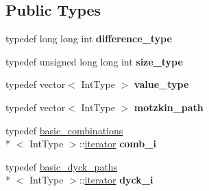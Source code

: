 \subsection*{Public Types}
\begin{DoxyCompactItemize}
\item 
\hypertarget{classdscr_1_1basic__motzkin__paths_a9402d615400ae3a6f0118ffd697b4b1e}{typedef long long int {\bfseries difference\-\_\-type}}\label{classdscr_1_1basic__motzkin__paths_a9402d615400ae3a6f0118ffd697b4b1e}

\item 
\hypertarget{classdscr_1_1basic__motzkin__paths_aed08930df85303a0579b29f517915c74}{typedef unsigned long long int {\bfseries size\-\_\-type}}\label{classdscr_1_1basic__motzkin__paths_aed08930df85303a0579b29f517915c74}

\item 
\hypertarget{classdscr_1_1basic__motzkin__paths_a840f3a00a0d533dfd0043452bf9e8f77}{typedef vector$<$ Int\-Type $>$ {\bfseries value\-\_\-type}}\label{classdscr_1_1basic__motzkin__paths_a840f3a00a0d533dfd0043452bf9e8f77}

\item 
\hypertarget{classdscr_1_1basic__motzkin__paths_a38b8fc3d7906eb86327e15dd3d696f6e}{typedef vector$<$ Int\-Type $>$ {\bfseries motzkin\-\_\-path}}\label{classdscr_1_1basic__motzkin__paths_a38b8fc3d7906eb86327e15dd3d696f6e}

\item 
\hypertarget{classdscr_1_1basic__motzkin__paths_af658d0d3796a9bc3b1a2ed14b03e22dd}{typedef \hyperlink{classdscr_1_1basic__combinations}{basic\-\_\-combinations}\\*
$<$ Int\-Type $>$\-::\hyperlink{classdscr_1_1basic__motzkin__paths_1_1iterator}{iterator} {\bfseries comb\-\_\-i}}\label{classdscr_1_1basic__motzkin__paths_af658d0d3796a9bc3b1a2ed14b03e22dd}

\item 
\hypertarget{classdscr_1_1basic__motzkin__paths_a06cf82036bda9e09dcb3ca6e41a812bb}{typedef \hyperlink{classdscr_1_1basic__dyck__paths}{basic\-\_\-dyck\-\_\-paths}\\*
$<$ Int\-Type $>$\-::\hyperlink{classdscr_1_1basic__motzkin__paths_1_1iterator}{iterator} {\bfseries dyck\-\_\-i}}\label{classdscr_1_1basic__motzkin__paths_a06cf82036bda9e09dcb3ca6e41a812bb}

\end{DoxyCompactItemize}
